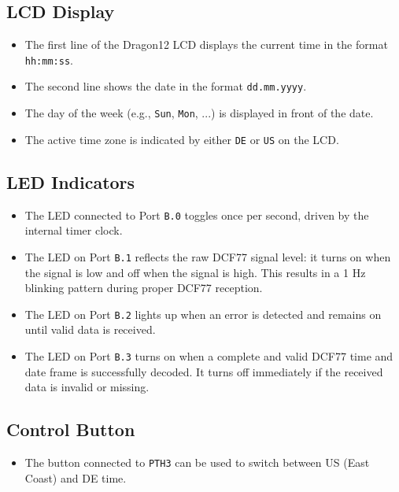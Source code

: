 \documentclass[a4paper,12pt]{article}
\begin{document}

\subsection{LCD Display}
\begin{itemize}
    \item The first line of the Dragon12 LCD displays the current time in the format \texttt{hh:mm:ss}.
    \item The second line shows the date in the format \texttt{dd.mm.yyyy}.
    \item The day of the week (e.g., \texttt{Sun}, \texttt{Mon}, ...) is displayed in front of the date.
    \item The active time zone is indicated by either \texttt{DE} or \texttt{US} on the LCD.
\end{itemize}


\subsection{LED Indicators}
\begin{itemize}
    \item The LED connected to Port \texttt{B.0} toggles once per second, driven by the internal timer clock.
    \item The LED on Port \texttt{B.1} reflects the raw DCF77 signal level: it turns on when the signal is low and off when the signal is high.  
    This results in a 1 Hz blinking pattern during proper DCF77 reception.
    \item The LED on Port \texttt{B.2} lights up when an error is detected and remains on until valid data is received.
    \item The LED on Port \texttt{B.3} turns on when a complete and valid DCF77 time and date frame is successfully decoded.  
    It turns off immediately if the received data is invalid or missing.
\end{itemize}


\subsection{Control Button}
\begin{itemize}
    \item The button connected to \texttt{PTH3} can be used to switch between US (East Coast) and DE time.
\end{itemize}
\end{document}
